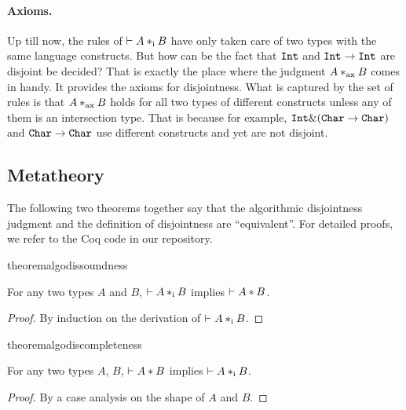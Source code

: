 
\paragraph{Axioms.} Up till now, the rules of $ \vdash A *_\textnormal{i} B $ have only
taken care of two types with the same language constructs. But how can be the
fact that $\texttt{Int}$ and $\texttt{Int} \to \texttt{Int}$ are disjoint be decided?
That is exactly the place where the judgment $ A *_\textnormal{ax} B $ comes in handy.
It provides the axioms for disjointness. What is captured by the set of rules is
that $ A *_\textnormal{ax} B $ holds for all two types of different constructs unless
any of them is an intersection type. That is because for example, $ \texttt{Int}
\& (\texttt{Char} \to \texttt{Char}) $ and $ \texttt{Char} \to \texttt{Char} $ use different
constructs and yet are not disjoint.

\subsection{Metatheory}

The following two theorems together say that the algorithmic disjointness
judgment and the definition of disjointness are ``equivalent''. For detailed
proofs, we refer to the Coq code in our repository.

\begin{restatable}{theorem}{algodissoundness}
  \label{theorem:soundness}

  For any two types $A$ and $B$, $\vdash A *_\textnormal{i} B$ implies $\vdash A * B$.
\end{restatable}

\begin{proof}
  By induction on the derivation of $\vdash A *_\textnormal{i} B$.
\end{proof}

\begin{restatable}{theorem}{algodiscompleteness}
  \label{theorem:completeness}

  For any two types $A$, $B$, $\vdash A * B$ implies $\vdash A *_\textnormal{i} B$.
\end{restatable}

\begin{proof}
  By a case analysis on the shape of $A$ and $B$.
\end{proof}
